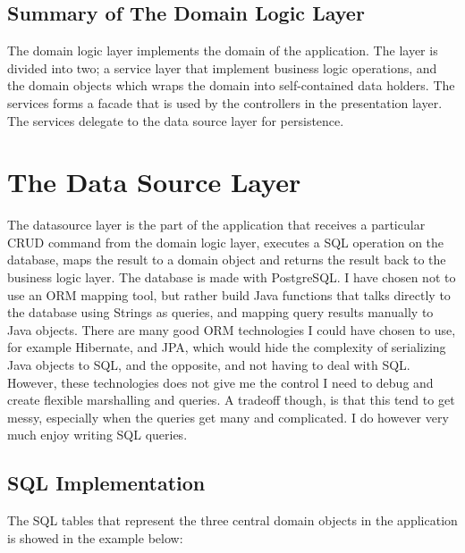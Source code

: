 \subsection{Summary of The Domain Logic Layer}
The domain logic layer implements the domain of the application. The layer is divided into two; a service layer that implement business logic operations, and the domain objects which wraps the domain into self-contained data holders. The services forms a facade that is used by the controllers in the presentation layer. The services delegate to the data source layer for persistence.
	
\section{The Data Source Layer}
The datasource layer is the part of the application that receives a particular CRUD command from the domain logic layer, executes a SQL operation on the database, maps the result to a domain object and returns the result back to the business logic layer. The database is made with PostgreSQL. I have chosen not to use an ORM mapping tool, but rather build Java functions that talks directly to the database using Strings as queries, and mapping query results manually to Java objects. There are many good ORM technologies I could have chosen to use, for example Hibernate, and JPA, which would hide the complexity of serializing Java objects to SQL, and the opposite, and not having to deal with SQL. However, these technologies does not give me the control I need to debug and create flexible marshalling and queries. A tradeoff though, is that this tend to get messy, especially when the queries get many and complicated. I do however very much enjoy writing SQL queries. 
		
\subsection{SQL Implementation}
The SQL tables that represent the three central domain objects in the application is showed in the example below: 
		
